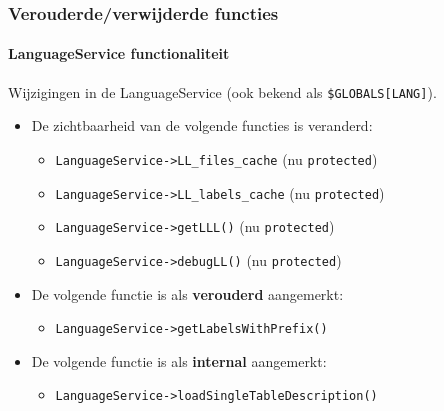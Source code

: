 
\begin{frame}[fragile]
	\frametitle{Verouderde/verwijderde functies}
	\framesubtitle{LanguageService functionaliteit}

	Wijzigingen in de LanguageService (ook bekend als \texttt{\$GLOBALS[LANG]}).
	\vspace{0.4cm}
	\begin{itemize}
		\item De zichtbaarheid van de volgende functies is veranderd:
			\begin{itemize}\smaller
				\item \texttt{LanguageService->LL\_files\_cache} (nu \texttt{protected})
				\item \texttt{LanguageService->LL\_labels\_cache} (nu \texttt{protected})
				\item \texttt{LanguageService->getLLL()} (nu \texttt{protected})
				\item \texttt{LanguageService->debugLL()} (nu \texttt{protected})
			\end{itemize}\normalsize
			\vspace{0.2cm}

		\item De volgende functie is als \textbf{verouderd} aangemerkt:
			\begin{itemize}\smaller
				\item \texttt{LanguageService->getLabelsWithPrefix()}
			\end{itemize}\normalsize
			\vspace{0.2cm}

		\item De volgende functie is als \textbf{internal} aangemerkt:
			\begin{itemize}\smaller
				\item \texttt{LanguageService->loadSingleTableDescription()}
			\end{itemize}\normalsize
			\vspace{0.2cm}

	\end{itemize}

\end{frame}


